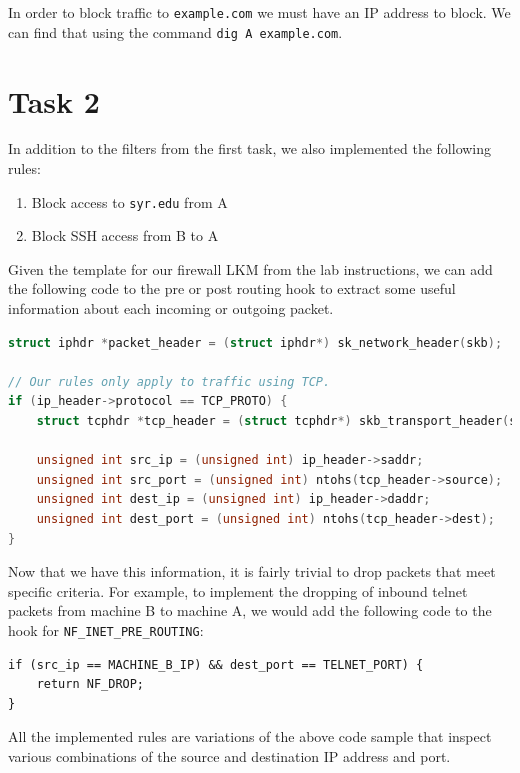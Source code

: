 \documentclass[12pt,letterpaper]{article}
\begin{document}
		In order to block traffic to \texttt{example.com} we must have an IP address to block. We can find that using the command \texttt{dig A example.com}.
	
	\section*{Task 2}
		In addition to the filters from the first task, we also implemented the following rules:
		
		\begin{enumerate}
			\item Block access to \texttt{syr.edu} from A
			\item Block SSH access from B to A
		\end{enumerate}
	
		Given the template for our firewall LKM from the lab instructions, we can add the following code to the pre or post routing hook to extract some useful information about each incoming or outgoing packet.
	
		\begin{lstlisting}[caption={Extracting info from packets.}, language=c]
struct iphdr *packet_header = (struct iphdr*) sk_network_header(skb);

// Our rules only apply to traffic using TCP.
if (ip_header->protocol == TCP_PROTO) {
	struct tcphdr *tcp_header = (struct tcphdr*) skb_transport_header(skb);
	
	unsigned int src_ip = (unsigned int) ip_header->saddr;
	unsigned int src_port = (unsigned int) ntohs(tcp_header->source);
	unsigned int dest_ip = (unsigned int) ip_header->daddr;
	unsigned int dest_port = (unsigned int) ntohs(tcp_header->dest);
}
		\end{lstlisting}
		
		Now that we have this information, it is fairly trivial to drop packets that meet specific criteria. For example, to implement the dropping of inbound telnet packets from machine B to machine A, we would add the following code to the hook for \texttt{NF\_INET\_PRE\_ROUTING}:
		
		\begin{lstlisting}[caption={Blocking telnet traffic from machine B to machine A}]
if (src_ip == MACHINE_B_IP) && dest_port == TELNET_PORT) {
	return NF_DROP;
}
		\end{lstlisting}
		
		All the implemented rules are variations of the above code sample that inspect various combinations of the source and destination IP address and port.
		
\end{document}
